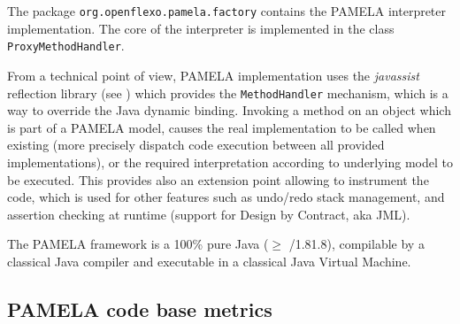 The package \texttt{org.openflexo.pamela.factory} contains the PAMELA interpreter implementation. The core of the interpreter is implemented in the class \texttt{ProxyMethodHandler}.

From a technical point of view, PAMELA implementation uses the \emph{javassist} reflection library (see \cite{shigueru2000}) which provides the \texttt{MethodHandler} mechanism, which is a way to override the Java dynamic binding. Invoking a method on an object which is part of a PAMELA model, causes the real implementation to be called when existing (more precisely dispatch code execution between all provided implementations), or the required interpretation according to underlying model to be executed. This provides also an extension point allowing to instrument the code, which is used for other features such as undo/redo stack management, and assertion checking at runtime (support for Design by Contract, aka JML).

The PAMELA framework is a 100\% pure Java ($\geq$ /1.81.8), compilable by a classical Java compiler and executable in a classical Java Virtual Machine.

\subsection{PAMELA code base metrics}


